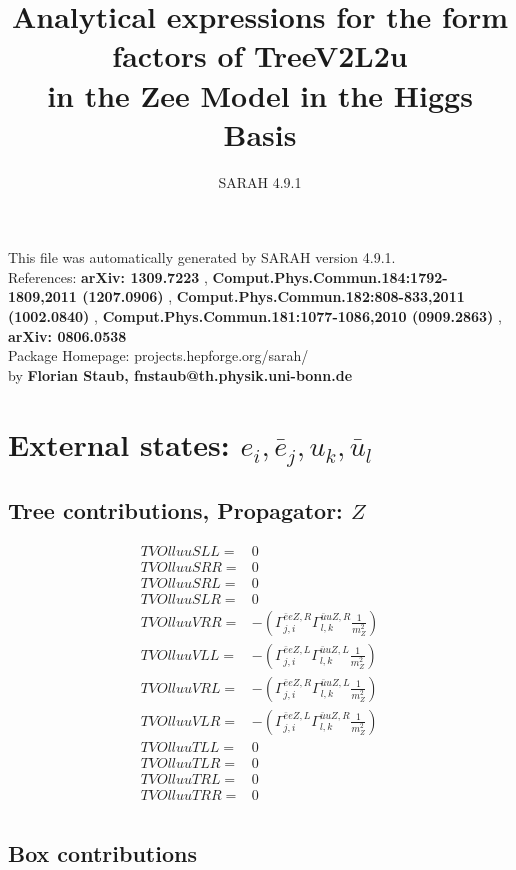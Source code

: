 \documentclass[A4,landscape]{article}
\begin{document}
\title{Analytical expressions for the form factors of TreeV2L2u\\ in the Zee Model in the Higgs Basis } 
 \author{SARAH 4.9.1} 
 \maketitle 
 \vspace{10cm} 
This file was automatically generated by SARAH version 4.9.1.  \\ 
References: {\bf arXiv: 1309.7223 }, {\bf Comput.Phys.Commun.184:1792-1809,2011 (1207.0906) }, {\bf Comput.Phys.Commun.182:808-833,2011 (1002.0840) }, {\bf Comput.Phys.Commun.181:1077-1086,2010 (0909.2863) }, {\bf arXiv: 0806.0538 } \\ 
Package Homepage: projects.hepforge.org/sarah/ \\ 
by {\bf Florian Staub, fnstaub@th.physik.uni-bonn.de} 
 \pagebreak 
 \tableofcontents 
 \pagebreak 
\section{External states: ${e_{{i}}, \bar{e}_{{j}}, u_{{k}}, \bar{u}_{{l}}}$} 
\subsection{Tree contributions, Propagator: $Z$} 

\begin{align} 
  TVOlluuSLL= & 0 \\ 
  TVOlluuSRR= & 0 \\ 
  TVOlluuSRL= & 0 \\ 
  TVOlluuSLR= & 0 \\ 
  TVOlluuVRR= & -(\Gamma^{\bar{e}e Z ,R}_{j, i} \Gamma^{\bar{u}u Z ,R}_{l, k} \frac{1}{m^2_{Z}}) \\ 
  TVOlluuVLL= & -(\Gamma^{\bar{e}e Z ,L}_{j, i} \Gamma^{\bar{u}u Z ,L}_{l, k} \frac{1}{m^2_{Z}}) \\ 
  TVOlluuVRL= & -(\Gamma^{\bar{e}e Z ,R}_{j, i} \Gamma^{\bar{u}u Z ,L}_{l, k} \frac{1}{m^2_{Z}}) \\ 
  TVOlluuVLR= & -(\Gamma^{\bar{e}e Z ,L}_{j, i} \Gamma^{\bar{u}u Z ,R}_{l, k} \frac{1}{m^2_{Z}}) \\ 
  TVOlluuTLL= & 0 \\ 
  TVOlluuTLR= & 0 \\ 
  TVOlluuTRL= & 0 \\ 
  TVOlluuTRR= & 0 \\ 
\end{align} 
\subsection{Box contributions} 
\end{document}
